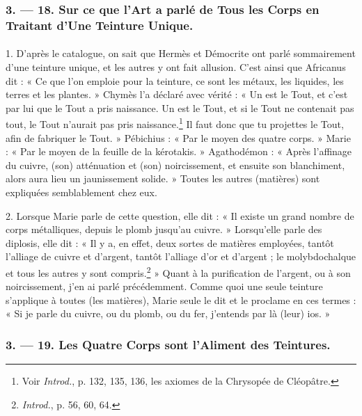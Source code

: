 \documentclass[landscape, a4paper, 11pt, oneside, polutonikogreek, french]{article}
\begin{document}
\bigskip
\centerline{\EightStarTaper}
\centerline{\EightStarTaper\EightStarTaper}
\bigskip

\subsubsection{3. --- 18. Sur ce que l'Art a parlé de Tous les Corps en Traitant d'Une Teinture Unique.}
\paragraph{}
1. D'après le catalogue, on sait que Hermès et Démocrite ont parlé sommairement d'une teinture unique, et les autres y ont fait allusion. C'est ainsi que Africanus dit : « Ce que l'on emploie pour la teinture, ce sont les métaux, les liquides, les terres et les plantes. » Chymès l'a déclaré avec vérité : « Un est le Tout, et c'est par lui que le Tout a pris naissance. Un est le Tout, et si le Tout ne contenait pas tout, le Tout n'aurait pas pris naissance.\footnote{Voir \emph{Introd.}, p. 132, 135, 136, les axiomes de la Chrysopée de Cléopâtre.} Il faut donc que tu projettes le Tout, afin de fabriquer le Tout. » Pébichius : « Par le moyen des quatre corps. » Marie : « Par le moyen de la feuille de la kérotakis. » Agathodémon : « Après l'affinage du cuivre, (son) atténuation et (son) noircissement, et ensuite son blanchiment, alors aura lieu un jaunissement solide. » Toutes les autres (matières) sont expliquées semblablement chez eux.

2. Lorsque Marie parle de cette question, elle dit : « Il existe un grand nombre de corps métalliques, depuis le plomb jusqu'au cuivre. » Lorsqu'elle parle des diplosis, elle dit : « Il y a, en effet, deux sortes de matières employées, tantôt l'alliage de cuivre et d'argent, tantôt l'alliage d'or et d'argent ; le molybdochalque et tous les autres y sont compris.\footnote{\emph{Introd.}, p. 56, 60, 64.} » Quant à la purification de l'argent, ou à son noircissement, j'en ai parlé précédemment. Comme quoi une seule teinture s'applique à toutes (les matières), Marie seule le dit et le proclame en ces termes : « Si je parle du cuivre, ou du plomb, ou du fer, j'entends par là (leur) ios. »

\bigskip
\centerline{\EightStarTaper}
\centerline{\EightStarTaper\EightStarTaper}
\bigskip

\subsubsection{3. --- 19. Les Quatre Corps sont l'Aliment des Teintures.}
\end{document}
